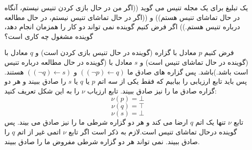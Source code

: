 
یک تبلیغ برای یک مجله تنیس می گوید ((اگر من در حال بازی کردن تنیس نیستم، آنگاه در حال تماشای تنیس هستم)) و ((اگر در حال تماشای تنیس نیستم، در حال مطالعه درباره تنیس هستم.)) اگر فرض کنیم گوینده نمی تواند دو کار را همزمان انجام دهد، گوینده مشغول چه کاری است؟
\begin{ans}

	فرض کنیم 
    $p$
    معادل با گزاره (گوینده در حال تنیس بازی کردن است) و
    $q$
    معادل با (گوینده در حال تماشای تنیس است) و
    $s$
    معادل با (گوینده در حال مطالعه درباره تنیس است باشد.)باشد. پس گزاره های صادق ما 
    $((\neg p) \leftarrow q)$
    و 
    $((\neg q) \leftarrow s)$
    هستند. پس باید تابع ارزیابی را بیابیم که فقط یکی از سه اتم 
    $p$
    یا 
    $q$
    یا 
    $s$
    را صادق ببیند و هر دو گزاره صادق ما را نیز صادق ببیند. 
    تابع ارزیاب 
    $\nu$
    را به این شکل تعریف کنید:
    \[\nu(p) = \bot\]
    \[\nu(q) = \top\]
    \[\nu(s) = \bot\]
    تابع 
    $\nu$
    تنها یک اتم 
    $q$
    ارضا می کند و هر دو گزاره شرطی ما را نیز صادق می بیند. پس گوینده درحال تماشای تنیس است.لازم به ذکر است اگر تابع 
    $\nu$
    اتمی غیر از اتم
    $q$
    را صادق ببیند. نمی تواند هر دو گزاره شرطی مفروض ما را صادق ببیند.
    

\end{ans}
